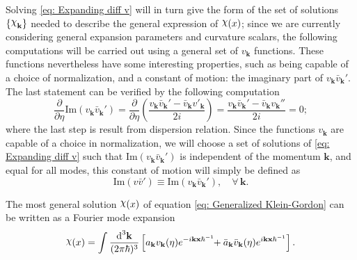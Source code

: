 Solving \cref{eq: Expanding diff v} will in turn give the form of the set of solutions $\left\{\rchi_{\mathbf{k}}\right\}$ needed to describe the general expression of $\rchi(x)$; since we are currently considering general expansion parameters and curvature scalars, the following computations will be carried out using a general set of $v_\mathbf{k}$ functions. These functions nevertheless have some interesting properties, such as being capable of a choice of normalization, and a constant of motion: the imaginary part of $v_\mathbf{k}\bar{v}_\mathbf{k}'$. The last statement can be verified by the following computation
\begin{equation}
	\frac{\partial}{\partial \eta }\text{Im}(v_\mathbf{k}\bar{v}_\mathbf{k}')=\frac{\partial}{\partial \eta}\left(\frac{v_\mathbf{k}\bar{v}_\mathbf{k}'-\bar v_\mathbf{k}v'_\mathbf{k}}{2i}\right)=\frac{v_\mathbf{k}\bar v_\mathbf{k}'-\bar v_\mathbf{k}v_\mathbf{k}''}{2i}=0;
\end{equation}
where the last step is result from dispersion relation. Since the functions $v_\mathbf{k}$ are capable of a choice in normalization, we will choose a set of solutions of \cref{eq: Expanding diff v} such that $\text{Im}(v_\mathbf{k}\bar{v}_\mathbf{k}')$ is independent of the momentum $\mathbf{k}$, and equal for all modes, this constant of motion will simply be defined as
\begin{equation}
	\text{Im}(v\bar{v}')\equiv \text{Im}(v_\mathbf{k}\bar{v}_\mathbf{k}'),\quad \forall\,\mathbf{k}.
\end{equation}

The most general solution $\rchi(x)$ of equation \cref{eq: Generalized Klein-Gordon} can be written as a Fourier mode expansion
\begin{equation}\label{eq: Expanding General Solution}
	\rchi(x)=\int\frac{\td^3\mathbf{k}}{(2\pi\hbar)^3}\left[a_\mathbf{k}v_\mathbf{k}(\eta)e^{-i\mathbf{kx}\hbar^{-1}}\!\!+\bar a_\mathbf{k}\bar v_\mathbf{k}(\eta)e^{i\mathbf{kx}\hbar^{-1}}\right].
\end{equation}

